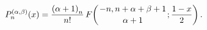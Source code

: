\[\mathop{P^{(\alpha,\beta)}_{n}\/}\nolimits\!\left(x\right)=\frac{\left(\alpha+%
1\right)_{n}}{n!}\mathop{F\/}\nolimits\!\left({-n,n+\alpha+\beta+1\atop\alpha+%
1};\frac{1-x}{2}\right).\]